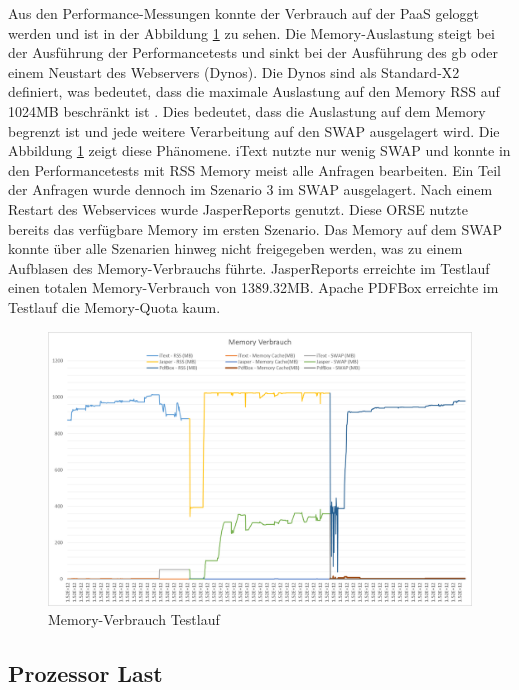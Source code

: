 \documentclass[main.tex]{subfiles}
\begin{document}
Aus den Performance-Messungen konnte der Verbrauch auf der PaaS geloggt werden und ist in der Abbildung \ref{figure:memorytestlauf} zu sehen. Die Memory-Auslastung steigt bei der Ausführung der Performancetests und sinkt bei der Ausführung des \acrshort{gb} oder einem Neustart des Webservers (Dynos). Die Dynos sind als Standard-X2 definiert, was bedeutet, dass die maximale Auslastung auf den Memory RSS auf 1024MB beschränkt ist \cite[vgl.~Kap~7.7]{hanjura_2014}. Dies bedeutet, dass die Auslastung auf dem Memory begrenzt ist und jede weitere Verarbeitung auf den SWAP ausgelagert wird. Die Abbildung \ref{figure:memorytestlauf} zeigt diese Phänomene. iText nutzte nur wenig SWAP und konnte in den Performancetests mit RSS Memory meist alle Anfragen bearbeiten. Ein Teil der Anfragen wurde dennoch im Szenario 3 im SWAP ausgelagert. Nach einem Restart des Webservices wurde JasperReports genutzt. Diese ORSE nutzte bereits das verfügbare Memory im ersten Szenario. Das Memory auf dem SWAP konnte über alle Szenarien hinweg nicht freigegeben werden, was zu einem Aufblasen des Memory-Verbrauchs führte. JasperReports erreichte im Testlauf einen totalen Memory-Verbrauch von 1389.32MB. Apache PDFBox erreichte im Testlauf die Memory-Quota kaum.




\begin{figure}[H]
\includegraphics[width=\textwidth]{mainpart/4_analyse_img/MemoryVerbrauch.png}
 \caption{Memory-Verbrauch Testlauf}
 \label{figure:memorytestlauf}
\end{figure}



\subsection{Prozessor Last}
\end{document}
